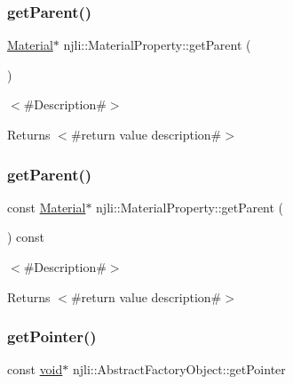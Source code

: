 \subsubsection{\texorpdfstring{get\+Parent()}{getParent()}\hspace{0.1cm}{\footnotesize\ttfamily [1/2]}}
{\footnotesize\ttfamily \mbox{\hyperlink{classnjli_1_1_material}{Material}}$\ast$ njli\+::\+Material\+Property\+::get\+Parent (\begin{DoxyParamCaption}{ }\end{DoxyParamCaption})}

$<$\#\+Description\#$>$

\begin{DoxyReturn}{Returns}
$<$\#return value description\#$>$ 
\end{DoxyReturn}
\mbox{\label{classnjli_1_1_material_property_ab401ed5ab389a124afe832ff9a67777b}} 
\subsubsection{\texorpdfstring{get\+Parent()}{getParent()}\hspace{0.1cm}{\footnotesize\ttfamily [2/2]}}
{\footnotesize\ttfamily const \mbox{\hyperlink{classnjli_1_1_material}{Material}}$\ast$ njli\+::\+Material\+Property\+::get\+Parent (\begin{DoxyParamCaption}{ }\end{DoxyParamCaption}) const}

$<$\#\+Description\#$>$

\begin{DoxyReturn}{Returns}
$<$\#return value description\#$>$ 
\end{DoxyReturn}
\mbox{\label{classnjli_1_1_material_property_ac4ca71716ed832be357f15f8262c8448}} 
\subsubsection{\texorpdfstring{get\+Pointer()}{getPointer()}}
{\footnotesize\ttfamily const \mbox{\hyperlink{_thread_8h_af1e856da2e658414cb2456cb6f7ebc66}{void}}$\ast$ njli\+::\+Abstract\+Factory\+Object\+::get\+Pointer}

